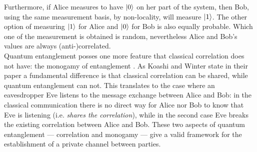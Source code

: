 	Furthermore, if Alice measures to have $|0 \rangle$ on her part of the system, then Bob, using the same measurement basis, by non-locality, will measure $|1 \rangle$.
	The other option of measuring $|1 \rangle$ for Alice and $|0 \rangle$ for Bob is also equally probable.
	Which one of the measurement is obtained is random, nevertheless Alice and Bob's values are always (anti-)correlated.\\

	
	Quantum entanglement posses one more feature that classical correlation does not have: the monogamy of entanglement \cite{KW04}. 
	As Koashi and Winter state in their paper a fundamental difference is that classical correlation can be shared, while quantum entanglement can not. 
	This translates to the case where an eavesdropper Eve listens to the message exchange between Alice and Bob: in the classical communication there is no direct way for Alice nor Bob to know that Eve is listening (i.e. \textit{shares the correlation}), while in the second case Eve breaks the existing correlation between Alice and Bob.
These two aspects of quantum entanglement --- correlation and monogamy --- give a valid framework for the establishment of a private channel between parties.
	
	
%			
		
